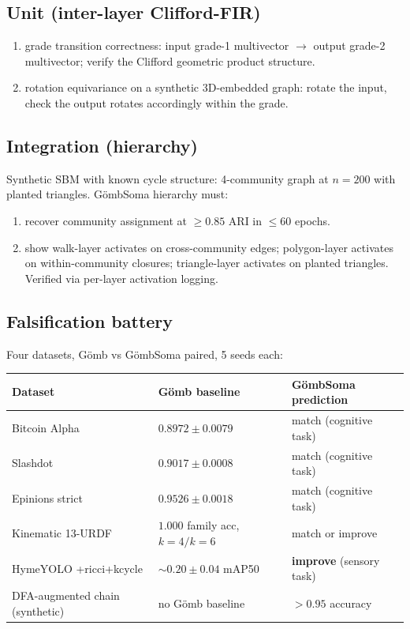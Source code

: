 \documentclass[11pt,a4paper]{article}
\newcommand{\Gomb}{G\"omb}
\newcommand{\Soma}{G\"ombSoma}
\begin{document}
\subsection{Unit (inter-layer Clifford-FIR)}

\begin{enumerate}
\item grade transition correctness: input grade-1 multivector
$\to$ output grade-2 multivector; verify the Clifford geometric
product structure.
\item rotation equivariance on a synthetic 3D-embedded graph: rotate
the input, check the output rotates accordingly within the grade.
\end{enumerate}

\subsection{Integration (hierarchy)}

Synthetic SBM with known cycle structure: 4-community graph at
$n = 200$ with planted triangles. \Soma{} hierarchy must:
\begin{enumerate}
\item recover community assignment at $\geq 0.85$ ARI in $\leq 60$ epochs.
\item show walk-layer activates on cross-community edges; polygon-layer activates on within-community closures; triangle-layer activates on planted triangles. Verified via per-layer activation logging.
\end{enumerate}

\subsection{Falsification battery}

Four datasets, \Gomb{} vs \Soma{} paired, 5 seeds each:

\begin{center}
\begin{tabular}{lll}
\toprule
Dataset             & \Gomb{} baseline                   & \Soma{} prediction                 \\
\midrule
Bitcoin Alpha       & $0.8972 \pm 0.0079$            & match (cognitive task)        \\
Slashdot            & $0.9017 \pm 0.0008$            & match (cognitive task)        \\
Epinions strict     & $0.9526 \pm 0.0018$            & match (cognitive task)        \\
Kinematic 13-URDF   & $1.000$ family acc, $k=4/k=6$  & match or improve              \\
HymeYOLO +ricci+kcycle & $\sim 0.20 \pm 0.04$ mAP50 & \textbf{improve} (sensory task) \\
DFA-augmented chain (synthetic) & no \Gomb{} baseline    & $> 0.95$ accuracy             \\
\bottomrule
\end{tabular}
\end{center}
\end{document}
